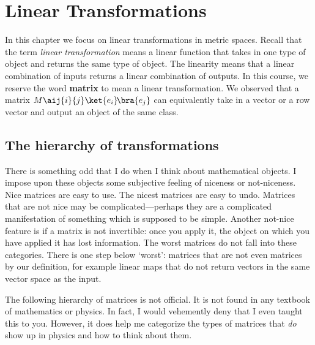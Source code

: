 \chapter{Linear Transformations}

In this chapter we focus on linear transformations in metric spaces. Recall that the term \emph{linear transformation} means a linear function that takes in one type of object and returns the same type of object. The linearity means that a linear combination of inputs returns a linear combination of outputs. In this course, we reserve the word \textbf{matrix} to mean a linear transformation. We observed that a matrix $M\aij{i}{j}\ket{e_i}\!\bra{e_j}$ can equivalently take in a vector or a row vector and output an object of the same class. 


\section{The hierarchy of transformations}
\label{sec:hierarchy:of:transformations}

There is something odd that I do when I think about mathematical objects. I impose upon these objects some subjective feeling of niceness or not-niceness. Nice matrices are easy to use. The nicest matrices are easy to undo. Matrices that are not nice may be complicated---perhaps they are a complicated manifestation of something which is supposed to be simple. Another not-nice feature is if a matrix is not invertible: once you apply it, the object on which you have applied it has lost information. The worst matrices do not fall into these categories. There is one step below `worst': matrices that are not even matrices by our definition, for example linear maps that do not return vectors in the same vector space as the input.

The following hierarchy of matrices is not official. It is not found in any textbook of mathematics or physics. In fact, I would vehemently deny that I even taught this to you. However, it does help me categorize the types of matrices that \emph{do} show up in physics and how to think about them.

